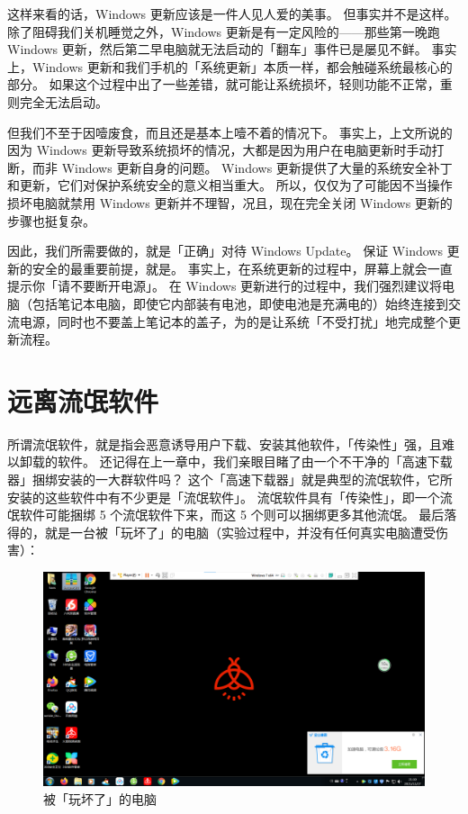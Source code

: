 这样来看的话，Windows 更新应该是一件人见人爱的美事。
但事实并不是这样。
除了阻碍我们关机睡觉之外，Windows 更新是有一定风险的——那些第一晚跑 Windows 更新，然后第二早电脑就无法启动的「翻车」事件已是屡见不鲜。
事实上，Windows 更新和我们手机的「系统更新」本质一样，都会触碰系统最核心的部分。
如果这个过程中出了一些差错，就可能让系统损坏，轻则功能不正常，重则完全无法启动。

但我们不至于因噎废食，而且还是基本上噎不着的情况下。
事实上，上文所说的因为 Windows 更新导致系统损坏的情况，大都是因为用户在电脑更新时手动打断，而非 Windows 更新自身的问题。
Windows 更新提供了大量的系统安全补丁和更新，它们对保护系统安全的意义相当重大。
所以，仅仅为了可能因不当操作损坏电脑就禁用 Windows 更新并不理智，况且，现在完全关闭 Windows 更新的步骤也挺复杂。

因此，我们所需要做的，就是「正确」对待 Windows Update。
保证 Windows 更新的安全的最重要前提，就是。
事实上，在系统更新的过程中，屏幕上就会一直提示你「请不要断开电源」。
在 Windows 更新进行的过程中，我们强烈建议将电脑（包括笔记本电脑，即使它内部装有电池，即使电池是充满电的）始终连接到交流电源，同时也不要盖上笔记本的盖子，为的是让系统「不受打扰」地完成整个更新流程。

\section{远离流氓软件}

所谓流氓软件，就是指会恶意诱导用户下载、安装其他软件，「传染性」强，且难以卸载的软件。
还记得在上一章中，我们亲眼目睹了由一个不干净的「高速下载器」捆绑安装的一大群软件吗？
这个「高速下载器」就是典型的流氓软件，它所安装的这些软件中有不少更是「流氓软件」。
流氓软件具有「传染性」，即一个流氓软件可能捆绑 5 个流氓软件下来，而这 5 个则可以捆绑更多其他流氓。
最后落得的，就是一台被「玩坏了」的电脑（实验过程中，并没有任何真实电脑遭受伤害）：

\begin{figure}[htb!]
  \centering
  \includegraphics[width=12cm]{assets/Computer_In_A_Mess.png}
  \caption{被「玩坏了」的电脑}
  \label{Computer_In_A_Mess}
\end{figure}

